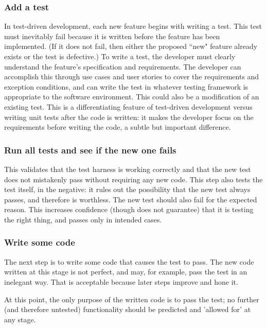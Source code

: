 \subsubsection{Add a test}

In test-driven development, each new feature begins with writing a test. This test must inevitably fail because it is written before the feature has been implemented. (If it does not fail, then either the proposed ``new" feature already exists or the test is defective.) To write a test, the developer must clearly understand the feature's specification and requirements. The developer can accomplish this through use cases and user stories to cover the requirements and exception conditions, and can write the test in whatever testing framework is appropriate to the software environment. This could also be a modification of an existing test. This is a differentiating feature of test-driven development versus writing unit tests after the code is written: it makes the developer focus on the requirements before writing the code, a subtle but important difference.

\subsubsection{Run all tests and see if the new one fails}

This validates that the test harness is working correctly and that the new test does not mistakenly pass without requiring any new code. This step also tests the test itself, in the negative: it rules out the possibility that the new test always passes, and therefore is worthless. The new test should also fail for the expected reason. This increases confidence (though does not guarantee) that it is testing the right thing, and passes only in intended cases.

\subsubsection{Write some code}

The next step is to write some code that causes the test to pass. The new code written at this stage is not perfect, and may, for example, pass the test in an inelegant way. That is acceptable because later steps improve and hone it.

At this point, the only purpose of the written code is to pass the test; no further (and therefore untested) functionality should be predicted and 'allowed for' at any stage.

